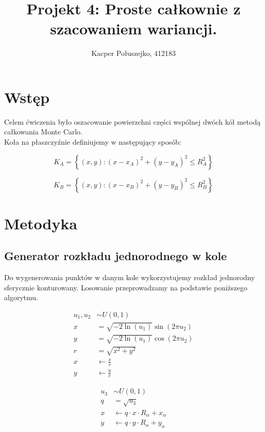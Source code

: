 \documentclass[a4paper,12pt,twoside]{article}
\title{\textbf{Projekt 4: Proste całkownie z szacowaniem wariancji.}}
\author{Kacper Połuszejko, 412183}
\date{}
\begin{document}
\maketitle

\section*{Wstęp}

Celem ćwiczenia było oszacowanie powierzchni części wspólnej dwóch kół metodą całkowania Monte Carlo. \\

Koła na płaszczyźnie definiujemy w następujący sposób:

\begin{equation}
K_A = \left\{ (x, y) : (x - x_A)^2 + (y - y_A)^2 \leq R_A^2 \right\}
\end{equation}

\begin{equation}
K_B = \left\{ (x, y) : (x - x_B)^2 + (y - y_B)^2 \leq R_B^2 \right\}
\end{equation}

\section{Metodyka}

\subsection{Generator rozkładu jednorodnego w kole}

Do wygenerowania punktów w danym kole wykorzystujemy rozkład jednorodny sferycznie konturowany. Losowanie przeprowadzamy na podstawie poniższego algorytmu.

\begin{equation*}
\begin{aligned}
u_1, u_2 &\sim U(0,1) \\
x &= \sqrt{-2\ln(u_1)}\sin(2\pi u_2) \\
y &= \sqrt{-2\ln(u_1)}\cos(2\pi u_2) \\
r &= \sqrt{x^2 + y^2} \\
x &\leftarrow \frac{x}{r} \\
y &\leftarrow \frac{y}{r}
\end{aligned}
\end{equation*}

\begin{equation*}
\begin{aligned}
u_3 &\sim U(0,1) \\
q &= \sqrt{u_3} \\
x &\leftarrow q \cdot x \cdot R_\alpha + x_\alpha \\
y &\leftarrow q \cdot y \cdot R_\alpha + y_\alpha
\end{aligned}
\end{equation*}
\end{document}
